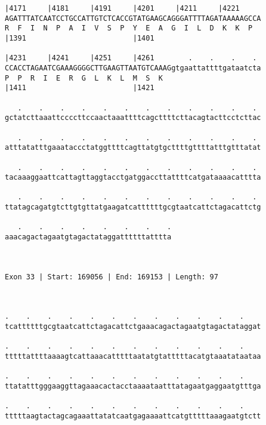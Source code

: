 \documentclass{article}
\begin{document}
\begin{Verbatim}
|4171     |4181     |4191     |4201     |4211     |4221     
AGATTTATCAATCCTGCCATTGTCTCACCGTATGAAGCAGGGATTTTAGATAAAAAGCCA
R  F  I  N  P  A  I  V  S  P  Y  E  A  G  I  L  D  K  K  P  
|1391                         |1401                         
  
|4231     |4241     |4251     |4261        .    .    .    . 
CCACCTAGAATCGAAAGGGGCTTGAAGTTAATGTCAAAGgtgaattattttgataatcta
P  P  R  I  E  R  G  L  K  L  M  S  K                       
|1411                         |1421                         
  
   .    .    .    .    .    .    .    .    .    .    .    . 
gctatcttaaattccccttccaactaaattttcagcttttcttacagtacttcctcttac
                                                            
   .    .    .    .    .    .    .    .    .    .    .    . 
atttatatttgaaataccctatggttttcagttatgtgcttttgttttatttgtttatat
                                                            
   .    .    .    .    .    .    .    .    .    .    .    . 
tacaaaggaattcattagttaggtacctgatggaccttattttcatgataaaacatttta
                                                            
   .    .    .    .    .    .    .    .    .    .    .    . 
ttatagcagatgtcttgtgttatgaagatcattttttgcgtaatcattctagacattctg
                                                            
   .    .    .    .    .    .    .    .
aaacagactagaatgtagactataggattttttatttta
                                       
                                       
 
Exon 33 | Start: 169056 | End: 169153 | Length: 97



.    .    .    .    .    .    .    .    .    .    .    .    
tcattttttgcgtaatcattctagacattctgaaacagactagaatgtagactataggat
                                                            
.    .    .    .    .    .    .    .    .    .    .    .    
tttttattttaaaagtcattaaacatttttaatatgtatttttacatgtaaatataataa
                                                            
.    .    .    .    .    .    .    .    .    .    .    .    
ttatatttgggaaggttagaaacactacctaaaataatttatagaatgaggaatgtttga
                                                            
.    .    .    .    .    .    .    .    .    .    .    .    
tttttaagtactagcagaaattatatcaatgagaaaattcatgtttttaaagaatgtctt
                                                            

\end{Verbatim}
\end{document}
